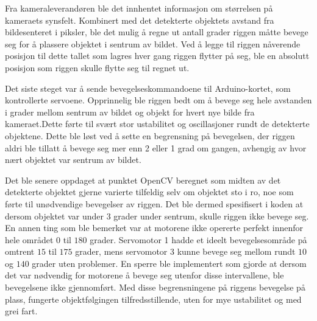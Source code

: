 Fra kameraleverandøren ble det innhentet informasjon om størrelsen på kameraets synsfelt. Kombinert med det detekterte objektets avstand fra bildesenteret i piksler, ble det mulig å regne ut antall grader riggen måtte bevege seg for å plassere objektet i sentrum av bildet. Ved å legge til riggen nåverende posisjon til dette tallet som lagres hver gang riggen flytter på seg, ble en absolutt posisjon som riggen skulle flytte seg til regnet ut.

Det siste steget var å sende bevegelseskommandoene til Arduino-kortet, som kontrollerte servoene. Opprinnelig ble riggen bedt om å bevege seg hele avstanden i grader mellom sentrum av bildet og objekt for hvert nye bilde fra kameraet.Dette førte til svært stor ustabilitet og oscillasjoner rundt de detekterte objektene. Dette ble løst ved å sette en begrensning på bevegelsen, der riggen aldri ble tillatt å bevege seg mer enn 2 eller 1 grad om gangen, avhengig av hvor nært objektet var sentrum av bildet.

Det ble senere oppdaget at punktet OpenCV beregnet som midten av det detekterte objektet gjerne varierte tilfeldig selv om objektet sto i ro, noe som førte til unødvendige bevegelser av riggen. Det ble dermed spesifisert i koden at dersom objektet var under 3 grader under sentrum, skulle riggen ikke bevege seg. En annen ting som ble bemerket var at motorene ikke opererte perfekt innenfor hele området $0$ til $180$ grader. Servomotor 1 hadde et ideelt bevegelsesområde på omtrent $15$ til $175$ grader, mens servomotor 3 kunne bevege seg mellom rundt $10$ og $140$ grader uten problemer. En sperre ble implementert som gjorde at dersom det var nødvendig for motorene å bevege seg utenfor disse intervallene, ble bevegelsene ikke gjennomført. Med disse begrensningene på riggens bevegelse på plass, fungerte objektfølgingen tilfredsstillende, uten for mye ustabilitet og med grei fart.
